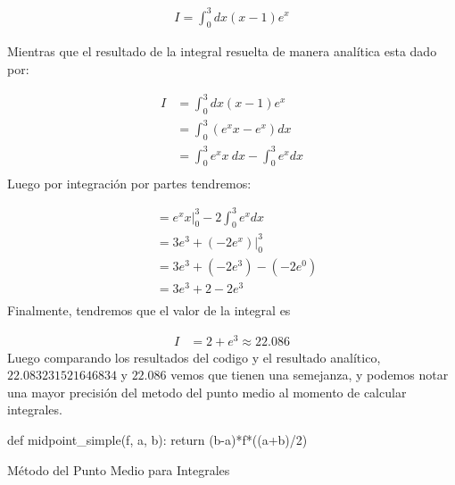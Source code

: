 \documentclass[../portafolio.tex]{subfiles}
\begin{document}
	\begin{align}
		I = \int_0^3 dx (x-1)e^x \label{eq:int1}
	\end{align}

Mientras que el resultado de la integral resuelta de manera anal\'itica esta dado por:
	
	\begin{align*}
		I &= \int_0^3 dx (x-1)e^x \\
		&= \int_0^3 (e^x x - e^x) dx \\
		&= \int_0^3 e^x x~dx - \int_0^3 e^x dx \\			
	\end{align*}
Luego por integraci\'on por partes tendremos:

	\begin{align*}
		  &= e^x x\Big|_0^3 -2 \int_0^3 e^x dx \\
		  &= 3e^3 + ( -2e^x ) \Big|_0^3 \\
		  &= 3e^3 + (-2e^3)-(-2e^0) \\
		  &= 3e^3 + 2 - 2e^3 \\
	\end{align*}
Finalmente, tendremos que el valor de la integral es 

	\begin{align*}
				I &= 2 + e^3 \approx 22.086
	\end{align*}
Luego comparando los resultados del codigo y el resultado anal\'itico, $22.083231521646834$ y $22.086$ vemos que tienen una semejanza, y podemos notar una mayor precisi\'on del metodo del punto medio al momento de calcular integrales.
\begin{listing}
	\begin{pythoncode}
def midpoint_simple(f, a, b):
    return (b-a)*f*((a+b)/2)	
	\end{pythoncode}
	\caption{M\'etodo del Punto Medio para Integrales}
	\label{cod:midpoint}
\end{listing}
\end{document}
